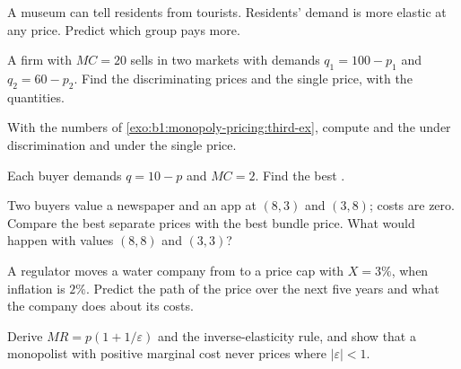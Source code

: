 \begin{exercise}[$\star$]\label{exo:b1:monopoly-pricing:predict}
A museum can tell residents from tourists. Residents' demand is more
elastic at any price. Predict which group pays more.
\end{exercise}

\begin{exercise}[$\star\star$]\label{exo:b1:monopoly-pricing:third-ex}
A firm with $MC = 20$ sells in two markets with demands $q_1 = 100 - p_1$ and
$q_2 = 60 - p_2$. Find the discriminating prices and the single price, with the
quantities.
\end{exercise}

\begin{exercise}[$\star\star$]\label{exo:b1:monopoly-pricing:welfare}
With the numbers of \cref{exo:b1:monopoly-pricing:third-ex}, compute  and the  under discrimination and under the single
price.
\end{exercise}

\begin{exercise}[$\star\star$]\label{exo:b1:monopoly-pricing:tpt}
Each buyer demands $q = 10 - p$ and $MC = 2$. Find the best .
\end{exercise}

\begin{exercise}[$\star\star$]\label{exo:b1:monopoly-pricing:bundle}
Two buyers value a newspaper and an app at $(8, 3)$ and $(3, 8)$; costs are
zero. Compare the best separate prices with the best bundle price. What
would happen with values $(8, 8)$ and $(3, 3)$?
\end{exercise}

\begin{exercise}[$\star\star$]\label{exo:b1:monopoly-pricing:cap}
A regulator moves a water company from  to a price cap
with $X = 3\%$, when inflation is $2\%$. Predict the path of the price over the
next five years and what the company does about its costs.
\end{exercise}

\begin{exercise}[$\star\star\star$]\label{exo:b1:monopoly-pricing:derive}
Derive $MR = p(1 + 1/\varepsilon)$ and the inverse-elasticity rule, and show that a
monopolist with positive marginal cost never prices where $|\varepsilon| < 1$.
\end{exercise}

